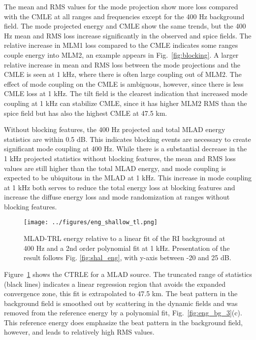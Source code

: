 \documentclass[preprint,NumberedRefs]{JASA}
\begin{document}
The mean and RMS values for the mode projection show more loss compared with the CMLE at all ranges and frequencies except for the 400 Hz background field. The mode projected energy and CMLE show the same trends, but the 400 Hz mean and RMS loss increase significantly in the observed and spice fields. The relative increase in MLM1 loss compared to the CMLE indicates some ranges couple energy into MLM2, an example appears in Fig.~\ref{fig:blocking}. A larger relative increase in mean and RMS loss between the mode projections and the CMLE is seen at 1 kHz, where there is often large coupling out of MLM2. The effect of mode coupling on the CMLE is ambiguous, however, since there is less CMLE loss at 1 kHz. The tilt field is the clearest indication that increased mode coupling at 1 kHz can stabilize CMLE, since it has higher MLM2 RMS than the spice field but has also the highest CMLE at 47.5 km.

Without blocking features, the 400 Hz projected and total MLAD energy statistics are within 0.5 dB. This indicates blocking events are necessary to create significant mode coupling at 400 Hz. While there is a substantial decrease in the 1 kHz projected statistics without blocking features, the mean and RMS loss values are still higher than the total MLAD energy, and mode coupling is expected to be ubiquitous in the MLAD at 1 kHz. This increase in mode coupling at 1 kHz both serves to reduce the total energy loss at blocking features and increase the diffuse energy loss and mode randomization at ranges without blocking features.

\begin{figure}
\texttt{[image: ../figures/eng\_shallow\_tl.png]}
        \caption{MLAD-TRL energy relative to a linear fit of the RI background at 400 Hz and a 2nd order polynomial fit at 1 kHz. Presentation of the result follows Fig. \ref{fig:shal_eng}, with y-axis between -20 and 25 dB.}
    \label{fig:eng_tl}
\end{figure}
Figure~\ref{fig:eng_tl} shows the CTRLE for a MLAD source. The truncated range of statistics (black lines) indicates a linear regression region that avoids the expanded convergence zone, this fit is extrapolated to 47.5 km. The beat pattern in the background field is smoothed out by scattering in the dynamic fields and was removed from the reference energy by a polynomial fit, Fig.~\ref{fig:eng_bg_3}(c). This reference energy does emphasize the beat pattern in the background field, however, and leads to relatively high RMS values.
\end{document}
